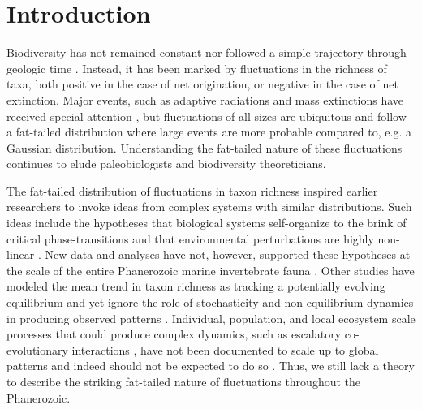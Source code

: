 \documentclass[12pt]{article}
\let\citep=\cite
\begin{document}
\section{Introduction}

Biodiversity has not remained constant nor followed a simple
trajectory through geologic time \citep{raup1982, sepkoski1984,
  gilinsky1994, liow2007, alroy08}.  Instead, it has been marked by
fluctuations in the richness of taxa, both positive in the case of net
origination, or negative in the case of net extinction. Major events,
such as adaptive radiations and mass extinctions have received special
attention \citep{benton1995, Erwin1998}, but fluctuations of all sizes
are ubiquitous \citep{sepkoski1984, alroy08} and follow a fat-tailed
distribution where large events are more probable compared to, e.g. a
Gaussian distribution. Understanding the fat-tailed nature of these
fluctuations continues to elude paleobiologists and biodiversity
theoreticians.

The fat-tailed distribution of fluctuations in taxon richness inspired
earlier researchers to invoke ideas from complex systems with similar
distributions. Such ideas include the hypotheses that biological
systems self-organize to the brink of critical phase-transitions
\citep{bak1993, sole1997} and that environmental perturbations are
highly non-linear \citep{newman1995}. New data and analyses have not,
however, supported these hypotheses at the scale of the entire
Phanerozoic marine invertebrate fauna \citep{kirchner1998, alroy08}.
Other studies have modeled the mean trend in taxon richness as
tracking a potentially evolving equilibrium \citep{sepkoski1984,
  alroy2010, quental2013} and yet ignore the role of stochasticity and
non-equilibrium dynamics in producing observed patterns
\citep{erwin2012, liow2007, jordan2016}. Individual, population, and
local ecosystem scale processes that could produce complex dynamics,
such as escalatory co-evolutionary interactions \citep{vermeij1987},
have not been documented to scale up to global patterns
\citep{madin2006} and indeed should not be expected to do so
\citep{vermeij2008}.  Thus, we still lack a theory to describe the
striking fat-tailed nature of fluctuations throughout the Phanerozoic.
\end{document}

